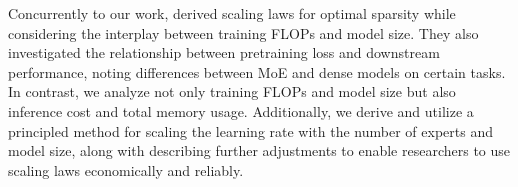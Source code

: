 Concurrently to our work, \citet{abnar2025parametersvsflopsscaling} derived scaling laws for optimal sparsity while considering the interplay between training FLOPs and model size. They also investigated the relationship between pretraining loss and downstream performance, noting differences between MoE and dense models on certain tasks. In contrast, we analyze not only training FLOPs and model size but also inference cost and total memory usage. Additionally, we derive and utilize a principled method for scaling the learning rate with the number of experts and model size, along with describing further adjustments to enable researchers to use scaling laws economically and reliably.



















\newpage